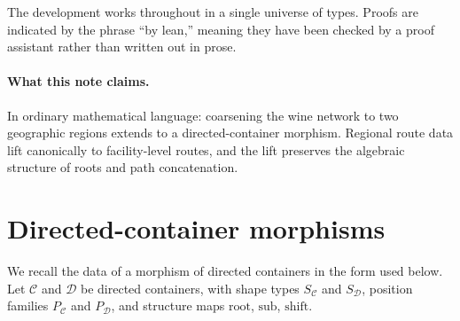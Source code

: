 \documentclass[11pt,a4paper]{article}
\theoremstyle{plain}
\theoremstyle{definition}
\newcommand{\rootpos}{\mathrm{root}}
\newcommand{\sub}{\mathrm{sub}}
\newcommand{\shift}{\mathrm{shift}}
\begin{document}
The development works throughout in a single universe of types. Proofs are
indicated by the phrase ``by lean,'' meaning they have been checked by a proof
assistant rather than written out in prose.

\paragraph{What this note claims.}
In ordinary mathematical language: coarsening the wine network to two
geographic regions extends to a directed-container morphism. Regional route
data lift canonically to facility-level routes, and the lift preserves the
algebraic structure of roots and path concatenation.

\section{Directed-container morphisms}

We recall the data of a morphism of directed containers in the form used
below. Let $\mathcal{C}$ and $\mathcal{D}$ be directed containers, with shape
types $S_{\mathcal{C}}$ and $S_{\mathcal{D}}$, position families $P_{\mathcal{C}}$
and $P_{\mathcal{D}}$, and structure maps $\rootpos$, $\sub$, $\shift$.
\end{document}
